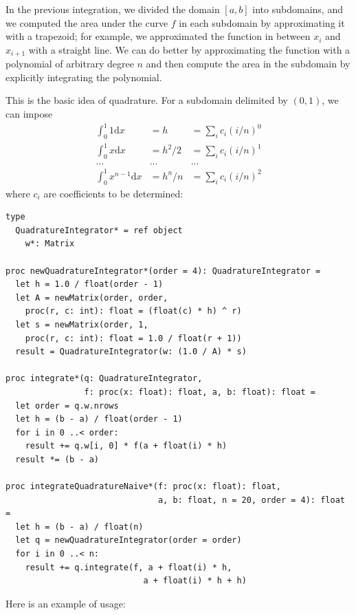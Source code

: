 \documentclass[justified, sixbynine]{tufte-book}
\def\ft{\small\tt}
\theoremstyle{plain}%
\newtheorem * {corollary}{Corollary}
\theoremstyle{definition}
\theoremstyle{remark}
\newtheorem * {remark}{Remark}
\newtheorem * {note}{Note}
\begin{document}
\begin{fullwidth}

In the previous integration, we divided the domain $[a, b]$ into subdomains, and we computed the area under the curve $f$ in each subdomain by approximating it with a trapezoid; for example, we approximated the function in between $x_i$ and $x_{i+1}$ with a straight line. We can do better by approximating the function with a polynomial of arbitrary degree $n$ and then compute the area in the subdomain by explicitly integrating the polynomial.

This is the basic idea of quadrature. For a subdomain delimited by $(0, 1)$, we can impose
\begin{eqnarray}
\int_0^1 1\textrm{d}x &= h &= \sum_i c_i (i/n)^0 \\
\int_0^1 x\textrm{d}x &= h^2/2 &= \sum_i c_i (i/n)^1 \\
... & ... & ... \\
\int_0^1 x^{n-1}\textrm{d}x &= h^n/n &= \sum_i c_i (i/n)^2
\end{eqnarray}
where $c_i$ are coefficients to be determined:


\begin{lstlisting}[caption={in file: {\ft nlib/integration.nim}}]
type
  QuadratureIntegrator* = ref object
    w*: Matrix

proc newQuadratureIntegrator*(order = 4): QuadratureIntegrator =
  let h = 1.0 / float(order - 1)
  let A = newMatrix(order, order,
    proc(r, c: int): float = (float(c) * h) ^ r)
  let s = newMatrix(order, 1,
    proc(r, c: int): float = 1.0 / float(r + 1))
  result = QuadratureIntegrator(w: (1.0 / A) * s)

proc integrate*(q: QuadratureIntegrator,
                f: proc(x: float): float, a, b: float): float =
  let order = q.w.nrows
  let h = (b - a) / float(order - 1)
  for i in 0 ..< order:
    result += q.w[i, 0] * f(a + float(i) * h)
  result *= (b - a)

proc integrateQuadratureNaive*(f: proc(x: float): float,
                               a, b: float, n = 20, order = 4): float =
  let h = (b - a) / float(n)
  let q = newQuadratureIntegrator(order = order)
  for i in 0 ..< n:
    result += q.integrate(f, a + float(i) * h,
                            a + float(i) * h + h)
\end{lstlisting}

Here is an example of usage:


\end{fullwidth}
\end{document}
